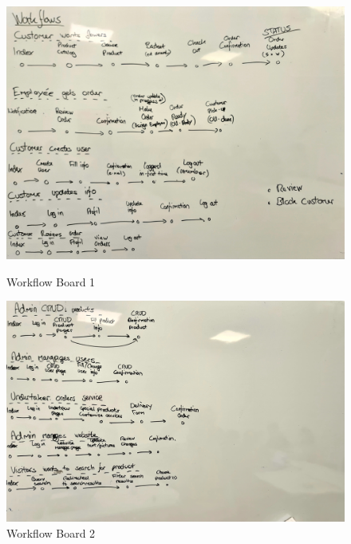 \begin{figure}[H]
    \centering
    \begin{minipage}[b]{0.45\textwidth}
        \centering
        \includegraphics[width=\textwidth]{figures/scrum/workflow-board1.jpg}
        \caption{Workflow Board 1}
        \label{fig:workflow-board1}
    \end{minipage}
    \hfill
    \begin{minipage}[b]{0.45\textwidth}
        \centering
        \includegraphics[width=\textwidth]{figures/scrum/workflow-board2.jpg}
        \caption{Workflow Board 2}
        \label{fig:workflow-board2}
    \end{minipage}
\end{figure}

